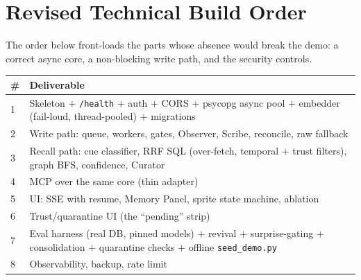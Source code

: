 \section{Revised Technical Build Order}
The order below front-loads the parts whose absence would break the demo: a correct async core, a
non-blocking write path, and the security controls.
\begin{longtable}{@{}p{}p{}@{}}
\toprule
\# & Deliverable \\
\midrule
1 & Skeleton $+$ \texttt{/health} $+$ auth $+$ CORS $+$ psycopg async pool $+$ embedder (fail-loud, thread-pooled) $+$ migrations \\
2 & Write path: queue, workers, gates, Observer, Scribe, reconcile, raw fallback \\
3 & Recall path: cue classifier, RRF SQL (over-fetch, temporal $+$ trust filters), graph BFS, confidence, Curator \\
4 & MCP over the same core (thin adapter) \\
5 & UI: SSE with resume, Memory Panel, sprite state machine, ablation \\
6 & Trust/quarantine UI (the ``pending'' strip) \\
7 & Eval harness (real DB, pinned models) $+$ revival $+$ surprise-gating $+$ consolidation $+$ quarantine checks $+$ offline \texttt{seed\_demo.py} \\
8 & Observability, backup, rate limit \\
\bottomrule
\end{longtable}

